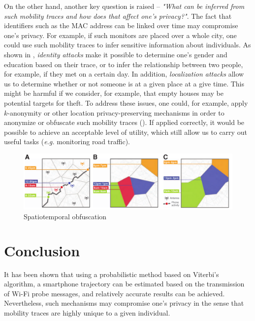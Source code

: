 \documentclass[conference]{IEEEtran}
\begin{document}
On the other hand, another key question is raised -- \textit{"What can be 
inferred from such mobility traces and how does that affect one's privacy?"}. 
The fact that identifiers such as the MAC address can be linked over time may 
compromise one's privacy. For example, if such monitors are placed over a whole 
city, one could use such mobility traces to infer sensitive information about 
individuals. As shown in \cite{8329504}, \textit{identity attacks} make it 
possible to determine one's gender and education based on their trace, or to 
infer the relationship between two people, for example, if they met on a 
certain day. In addition, \textit{localization attacks} allow us to determine
whether or not someone is at a given place at a give time. This might be 
harmful if we consider, for example, that empty houses may be potential targets 
for theft. To address these issues, one could, for example, apply $k$-anonymity 
or other location privacy-preserving mechanisms in order to anonymize or 
obfuscate such mobility traces (). If applied correctly, 
it would be possible to achieve an acceptable level of utility, which still
allow us to carry out useful tasks (\textit{e.g.} monitoring road traffic).

\begin{figure}[H]
    \centering
    \includegraphics[width=.5\textwidth]{img/k.png}
    \caption{Spatiotemporal obfuscation \cite{deMontjoye2013UniqueIT}}
    \label{fig:k-anonimity}
\end{figure}

\section{Conclusion} \label{sec:conclusions}

It has been shown that using a probabilistic method based on Viterbi’s 
algorithm, a smartphone trajectory can be estimated based on the transmission 
of Wi-Fi probe messages, and relatively accurate results can be achieved. 
Nevertheless, such mechanisms may compromise one's privacy in the sense that 
mobility traces are highly unique to a given individual.



\end{document}
